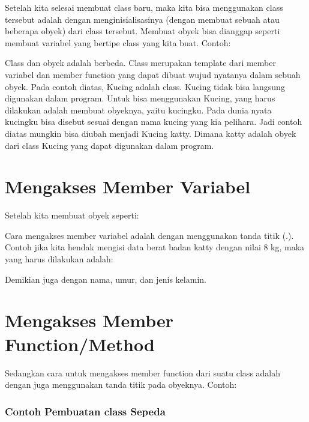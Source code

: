 Setelah kita selesai membuat class baru, maka kita bisa menggunakan
class tersebut adalah dengan menginisialisasinya (dengan membuat sebuah
atau beberapa obyek) dari class tersebut. Membuat obyek bisa dianggap
seperti membuat variabel yang bertipe class yang kita buat. Contoh:



Class dan obyek adalah berbeda. Class merupakan template dari member
variabel dan member function yang dapat dibuat wujud nyatanya dalam
sebuah obyek. Pada contoh diatas, Kucing adalah class. Kucing tidak bisa
langsung digunakan dalam program. Untuk bisa menggunakan Kucing, yang
harus dilakukan adalah membuat obyeknya, yaitu kucingku. Pada dunia
nyata kucingku bisa disebut sesuai dengan nama kucing yang kia pelihara.
Jadi contoh diatas mungkin bisa diubah menjadi Kucing katty. Dimana
katty adalah obyek dari class Kucing yang dapat digunakan dalam program.

\section{Mengakses Member Variabel}\label{mengakses-member-variabel}

Setelah kita membuat obyek seperti:



Cara mengakses member variabel adalah dengan menggunakan tanda titik
(.). Contoh jika kita hendak mengisi data berat badan katty dengan nilai
8 kg, maka yang harus dilakukan adalah:



Demikian juga dengan nama, umur, dan jenis kelamin.



\section{Mengakses Member
Function/Method}\label{mengakses-member-functionmethod}

Sedangkan cara untuk mengakses member function dari suatu class adalah
dengan juga menggunakan tanda titik pada obyeknya. Contoh:



\subsubsection*{Contoh Pembuatan class Sepeda}

